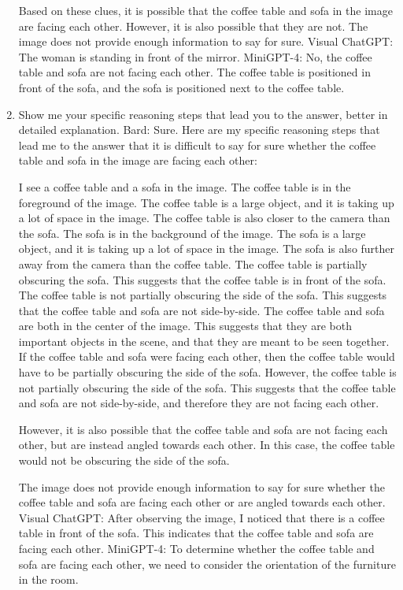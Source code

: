 \begin{enumerate}
    Based on these clues, it is possible that the coffee table and sofa in the image are facing each other. However, it is also possible that they are not. The image does not provide enough information to say for sure.
    \subitem Visual ChatGPT: The woman is standing in front of the mirror.
    \subitem MiniGPT-4: No, the coffee table and sofa are not facing each other. The coffee table is positioned in front of the sofa, and the sofa is positioned next to the coffee table.
    \item Show me your specific reasoning steps that lead you to the answer, better in detailed explanation.
    \subitem Bard: 
    Sure. Here are my specific reasoning steps that lead me to the answer that it is difficult to say for sure whether the coffee table and sofa in the image are facing each other:
    
    I see a coffee table and a sofa in the image.
    The coffee table is in the foreground of the image. The coffee table is a large object, and it is taking up a lot of space in the image. The coffee table is also closer to the camera than the sofa.
    The sofa is in the background of the image. The sofa is a large object, and it is taking up a lot of space in the image. The sofa is also further away from the camera than the coffee table.
    The coffee table is partially obscuring the sofa. This suggests that the coffee table is in front of the sofa.
    The coffee table is not partially obscuring the side of the sofa. This suggests that the coffee table and sofa are not side-by-side.
    The coffee table and sofa are both in the center of the image. This suggests that they are both important objects in the scene, and that they are meant to be seen together.
    If the coffee table and sofa were facing each other, then the coffee table would have to be partially obscuring the side of the sofa. However, the coffee table is not partially obscuring the side of the sofa. This suggests that the coffee table and sofa are not side-by-side, and therefore they are not facing each other.
    
    However, it is also possible that the coffee table and sofa are not facing each other, but are instead angled towards each other. In this case, the coffee table would not be obscuring the side of the sofa.
    
    The image does not provide enough information to say for sure whether the coffee table and sofa are facing each other or are angled towards each other.
    \subitem Visual ChatGPT: After observing the image, I noticed that there is a coffee table in front of the sofa. This indicates that the coffee table and sofa are facing each other.
    \subitem MiniGPT-4: To determine whether the coffee table and sofa are facing each other, we need to consider the orientation of the furniture in the room.


\end{enumerate}
